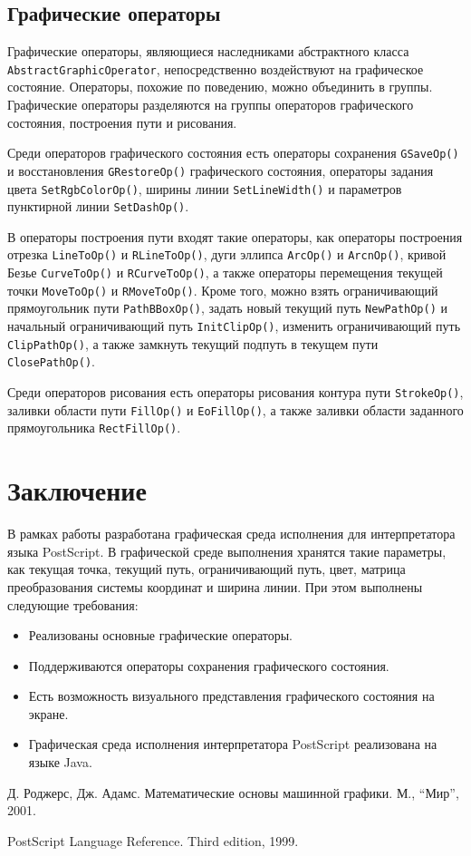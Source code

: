 \subsection{Графические операторы}
\sloppy

Графические операторы, являющиеся наследниками абстрактного класса \texttt{AbstractGraphicOperator}, непосредственно воздействуют на графическое состояние.
Операторы, похожие по поведению, можно объединить в группы. Графические операторы разделяются на группы операторов графического состояния, построения пути и рисования. 

Среди операторов графического состояния есть операторы сохранения \texttt{GSaveOp()} и восстановления \texttt{GRestoreOp()} графического состояния, операторы задания цвета \texttt{SetRgbColorOp()}, ширины линии \texttt{SetLineWidth()} и параметров пунктирной линии \texttt{SetDashOp()}.

В операторы построения пути входят такие операторы, как операторы построения отрезка \texttt{LineToOp()} и \texttt{RLineToOp()}, дуги эллипса \texttt{ArcOp()} и \texttt{ArcnOp()}, кривой Безье \texttt{CurveToOp()} и \texttt{RCurveToOp()}, а также операторы перемещения текущей точки \texttt{MoveToOp()} и \texttt{RMoveToOp()}. Кроме того, можно взять ограничивающий прямоугольник пути \texttt{PathBBoxOp()}, задать новый текущий путь \texttt{NewPathOp()} и начальный ограничивающий путь \texttt{InitClipOp()}, изменить ограничивающий путь \texttt{ClipPathOp()}, а также замкнуть текущий подпуть в текущем пути \texttt{ClosePathOp()}.

Среди операторов рисования есть операторы рисования контура пути \texttt{StrokeOp()}, заливки области пути \texttt{FillOp()} и \texttt{EoFillOp()}, а также заливки области заданного прямоугольника \texttt{RectFillOp()}. 


\section*{Заключение}

В рамках работы разработана графическая среда исполнения для интерпретатора языка PostScript. В графической среде выполнения хранятся такие параметры, как текущая точка, текущий путь, ограничивающий путь,  цвет,  матрица преобразования системы координат и ширина линии. 
При этом выполнены следующие требования:
\begin{itemize}
\item Реализованы основные графические операторы.
\item Поддерживаются операторы сохранения графического состояния.
\item Есть возможность визуального представления графического состояния на 
    экране.
\item Графическая среда исполнения интерпретатора PostScript реализована на языке Java.
\end{itemize}


\begin{thebibliography}{99}
Д. Роджерс, Дж. Адамс. Математические основы машинной графики. М., ``Мир'', 2001. 

PostScript Language Reference. Third edition, 1999.
\end{thebibliography}


